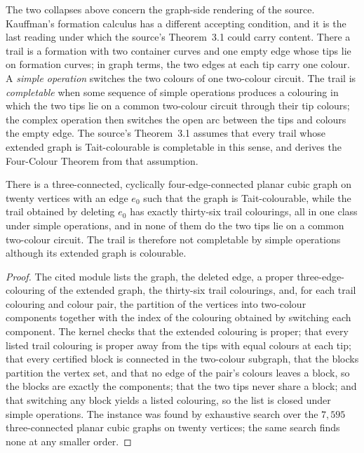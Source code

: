 The two collapses above concern the graph-side rendering of the source.
Kauffman's formation calculus has a different accepting condition, and it is
the last reading under which the source's Theorem~3.1 could carry content.
There a trail is a formation with two container curves and one empty edge
whose tips lie on formation curves; in graph terms, the two edges at each
tip carry one colour.  A \emph{simple operation} switches the two colours of
one two-colour circuit.  The trail is \emph{completable} when some sequence
of simple operations produces a colouring in which the two tips lie on a
common two-colour circuit through their tip colours; the complex operation
then switches the open arc between the tips and colours the empty edge.
The source's Theorem~3.1 assumes that every trail whose extended graph is
Tait-colourable is completable in this sense, and derives the Four-Colour
Theorem from that assumption.

\begin{proposition}
\label{prop:kauffman-completability-counterexample}
There is a three-connected, cyclically four-edge-connected planar cubic graph
on twenty vertices with an edge $e_0$ such that the graph is
Tait-colourable, while the trail obtained by deleting $e_0$ has exactly
thirty-six trail colourings, all in one class under simple operations, and
in none of them do the two tips lie on a common two-colour circuit.  The
trail is therefore not completable by simple operations although its
extended graph is colourable.
\end{proposition}

\begin{proof}
The cited module lists the graph, the deleted edge, a proper
three-edge-colouring of the extended graph, the thirty-six trail colourings,
and, for each trail colouring and colour pair, the partition of the vertices
into two-colour components together with the index of the colouring obtained
by switching each component.  The kernel checks that the extended colouring
is proper; that every listed trail colouring is proper away from the tips
with equal colours at each tip; that every certified block is connected in
the two-colour subgraph, that the blocks partition the vertex set, and that
no edge of the pair's colours leaves a block, so the blocks are exactly the
components; that the two tips never share a block; and that switching any
block yields a listed colouring, so the list is closed under simple
operations.  The instance was found by exhaustive search over the $7{,}595$
three-connected planar cubic graphs on twenty vertices; the same search
finds none at any smaller order.
\end{proof}

